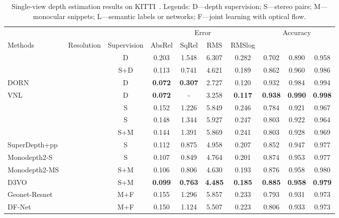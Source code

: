 \documentclass[twocolumn]{svjour3}
\renewcommand{\cite}[1]{\textcolor{blue}{\citep{#1}}}
\begin{document}
\begin{table*}[t]
  \setlength{\tabcolsep}{1.0mm}
  \caption{Single-view depth estimation results on KITTI~\cite{Geiger2013IJRR}. Legends: D---depth supervision; S---stereo pairs; M---monocular snippets; L---semantic labels or networks; F---joint learning with optical flow. }\label{tab:depth}
  \centering
  \begin{tabular}{l c c| c c c c | c c c}
    \hline
     & & & \multicolumn{4}{c|}{Error } & \multicolumn{3}{c}{Accuracy }  \\
     \cline{4-10}
     Methods & Resolution & Supervision & AbsRel & SqRel & RMS & RMSlog &  &  &  \\
     \hline
     \cite{eigen2014depth} &  &  D & 0.203 & 1.548 & 6.307 & 0.282 & 0.702 & 0.890 & 0.958 \\
\cite{kuznietsov2017semi} &  & S+D & 0.113 & 0.741 & 4.621 & 0.189 & 0.862 & 0.960 & 0.986 \\
     DORN~\cite{fu2018deep} &  & D & \textbf{0.072} & \textbf{0.307} & 2.727 & 0.120 & 0.932 & 0.984 & 0.994 \\
     VNL~\cite{Yin2019enforcing} &  & D & \textbf{0.072} & - & 3.258 & \textbf{0.117} & \textbf{0.938} & \textbf{0.990} & \textbf{0.998} \\
     \hline
     \cite{garg2016unsupervised} &  &S & 0.152 & 1.226 & 5.849 & 0.246 & 0.784 & 0.921 & 0.967 \\
     \cite{godard2017unsupervised} &  & S & 0.148 & 1.344 & 5.927 & 0.247 & 0.803 & 0.922 & 0.964 \\
     \cite{zhan2018unsupervised} &  & S+M & 0.144 & 1.391 & 5.869 & 0.241 & 0.803 & 0.928 & 0.969 \\
     SuperDepth+pp~\cite{pillai2019superdepth} &  & S & 0.112 & 0.875 & 4.958 & 0.207 & 0.852 & 0.947 & 0.977 \\
     Monodepth2-S\cite{monodepth2} &  & S & 0.107 & 0.849 & 4.764 & 0.201 & 0.874 & 0.953 & 0.977 \\
     Monodepth2-MS\cite{monodepth2} &  & S+M & 0.106 & 0.806 & 4.630 & 0.193 & 0.876 & 0.958 & 0.980 \\
     D3VO~\cite{yang2020d3vo} &  & S+M & \textbf{0.099} & \textbf{0.763} & \textbf{4.485} & \textbf{0.185} & \textbf{0.885} & \textbf{0.958} & \textbf{0.979} \\
     \hline
     Geonet-Resnet~\cite{yin2018geonet} &  & M+F & 0.155 & 1.296 & 5.857 & 0.233 & 0.793 & 0.931 & 0.973\\
     DF-Net~\cite{zou2018df} &  & M+F & 0.150 & 1.124 & 5.507 & 0.223 & 0.806 & 0.933 & 0.973 \\

\end{tabular}
\end{table*}
\end{document}
